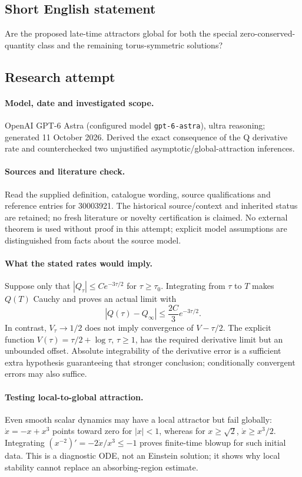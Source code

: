\documentclass[11pt]{article}
\begin{document}
\subsection{Short English statement}
Are the proposed late-time attractors global for both the special zero-conserved-quantity class and the remaining torus-symmetric solutions?
\subsection{Research attempt}
\paragraph{Model, date and investigated scope.}
OpenAI GPT-6 Astra (configured model \texttt{gpt-6-astra}), ultra reasoning; generated 11 October 2026. Derived the exact consequence of the Q derivative rate and counterchecked two unjustified asymptotic/global-attraction inferences.

\paragraph{Sources and literature check.}
Read the supplied definition, catalogue wording, source qualifications and reference entries for 30003921. The historical source/context and inherited status are retained; no fresh literature or novelty certification is claimed. No external theorem is used without proof in this attempt; explicit model assumptions are distinguished from facts about the source model.

\paragraph{What the stated rates would imply.} Suppose only that \(|Q_\tau|\le Ce^{-3\tau/2}\) for \(\tau\ge\tau_0\). Integrating from \(\tau\) to \(T\) makes \(Q(T)\) Cauchy and proves an actual limit with
\[
 |Q(\tau)-Q_\infty|\le\frac{2C}{3}e^{-3\tau/2}.
\]
In contrast, \(V_\tau\to1/2\) does not imply convergence of \(V-\tau/2\). The explicit function \(V(\tau)=\tau/2+\log\tau\), \(\tau\ge1\), has the required derivative limit but an unbounded offset. Absolute integrability of the derivative error is a sufficient extra hypothesis guaranteeing that stronger conclusion; conditionally convergent errors may also suffice.
\paragraph{Testing local-to-global attraction.} Even smooth scalar dynamics may have a local attractor but fail globally: \(\dot x=-x+x^3\) points toward zero for \(|x|<1\), whereas for \(x\ge\sqrt2\), \(\dot x\ge x^3/2\). Integrating \((x^{-2})'=-2\dot x/x^3\le-1\) proves finite-time blowup for such initial data. This is a diagnostic ODE, not an Einstein solution; it shows why local stability cannot replace an absorbing-region estimate.
\end{document}
